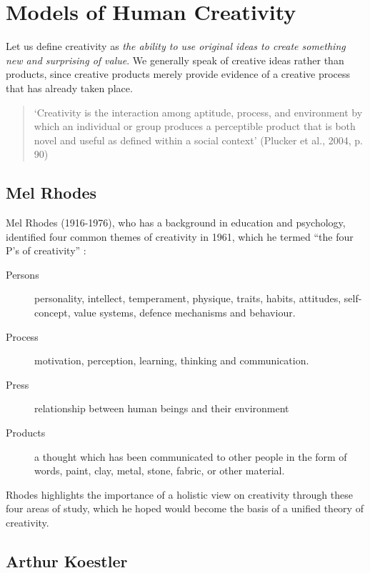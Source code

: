 \section{Models of Human Creativity}


Let us define creativity as \emph{the ability to use original ideas to create something new and surprising of value}. We generally speak of creative ideas rather than products, since creative products merely provide evidence of a creative process that has already taken place.

\begin{quote}
  ‘Creativity is the interaction among aptitude, process, and environment by which an individual or group produces a perceptible product that is both novel and useful as defined within a social context’ (Plucker et al., 2004, p. 90) \citep{Jordanous2012}
\end{quote}

\subsection{Mel Rhodes}

Mel Rhodes (1916-1976), who has a background in education and psychology, identified four common themes of creativity in 1961, which he termed ``the four P’s of creativity'' \citep{Rhodes1961}:

\begin{description}
  \item [Persons] personality, intellect, temperament, physique, traits, habits, attitudes, self-concept, value systems, defence mechanisms and behaviour.
  \item [Process] motivation, perception, learning, thinking and communication.
  \item [Press] relationship between human beings and their environment
  \item [Products] a thought which has been communicated to other people in the form of words, paint, clay, metal, stone, fabric, or other material.
\end{description}

Rhodes highlights the importance of a holistic view on creativity through these four areas of study, which he hoped would become the basis of a unified theory of creativity.

\subsection{Arthur Koestler}

